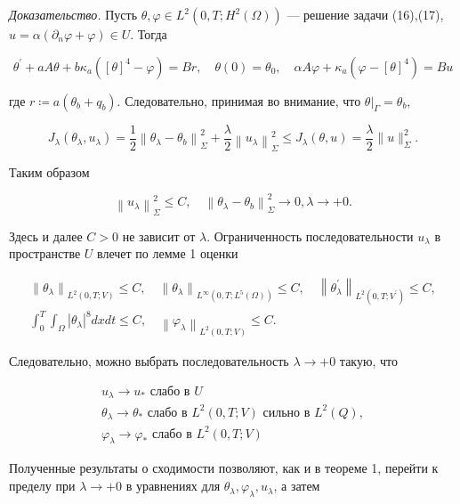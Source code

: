 \textit{Доказательство.}
Пусть $\theta, \varphi \in L^{2}\left(0, T ; H^{2}(\Omega)\right)$ — решение задачи
(16),(17), $u=\alpha\left(\partial_{n} \varphi+\varphi\right) \in U$.
Тогда

\[
\theta^{\prime}+a A \theta+b \kappa_{a}\left([\theta]^{4}-\varphi\right)=B r,
\quad \theta(0)=\theta_{0}, \quad \alpha A \varphi+\kappa_{a}\left(\varphi-[\theta]^{4}\right)=B u
\]


где $r\coloneqq a\left(\theta_{b}+q_{b}\right)$.
Следовательно, принимая во внимание, что $\left.\theta\right|_{\Gamma}=\theta_{b}$,

\[
J_{\lambda}\left(\theta_{\lambda},
u_{\lambda}\right)=\frac{1}{2}\left\|\theta_{\lambda}-\theta_{b}\right\|_{\Sigma}^{2}
+\frac{\lambda}{2}\left\|u_{\lambda}\right\|_{\Sigma}^{2}
\leq J_{\lambda}(\theta, u)=\frac{\lambda}{2}\|u\|_{\Sigma}^{2}.
\]

Таким образом

\[
\left\|u_{\lambda}\right\|_{\Sigma}^{2} \leq C,
\quad\left\|\theta_{\lambda}-\theta_{b}\right\|_{\Sigma}^{2} \rightarrow 0, \lambda \rightarrow+0.
\]


Здесь и далее $C>0$ не зависит от $\lambda$.
Ограниченность последовательности $u_{\lambda}$ в пространстве $U$ влечет по лемме 1 оценки

\[
\begin{gathered}
\left\|\theta_{\lambda}\right\|_{L^{2}(0, T ; V)} \leq C,
\quad\left\|\theta_{\lambda}\right\|_{L^{\infty}\left(0, T ; L^{5}(\Omega)\right)} \leq C,
\quad\left\|\theta_{\lambda}^{\prime}\right\|_{L^{2}\left(0, T ; V^{\prime}\right)} \leq C, \\
\int_{0}^{T} \int_{\Omega}\left|\theta_{\lambda}\right|^{8} d x d t \leq C,
\quad\left\|\varphi_{\lambda}\right\|_{L^{2}(0, T ; V)} \leq C.
\end{gathered}
\]


Следовательно, можно выбрать последовательность $\lambda\rightarrow+0$ такую, что

\[
\begin{gathered}
u_{\lambda} \rightarrow u_{*} \text { слабо в } U \\
\theta_{\lambda} \rightarrow \theta_{*} \text { слабо в } L^{2}(0, T; V) \text { сильно в } L^{2}(Q), \\
\varphi_{\lambda} \rightarrow \varphi_{*} \text { слабо в } L^{2}(0, T; V)
\end{gathered}
\]


Полученные результаты о сходимости позволяют, как и в теореме 1,
перейти к пределу при $\lambda \rightarrow+0$ в уравнениях для $\theta_{\lambda},
\varphi_{\lambda}, u_{\lambda} $, а затем

